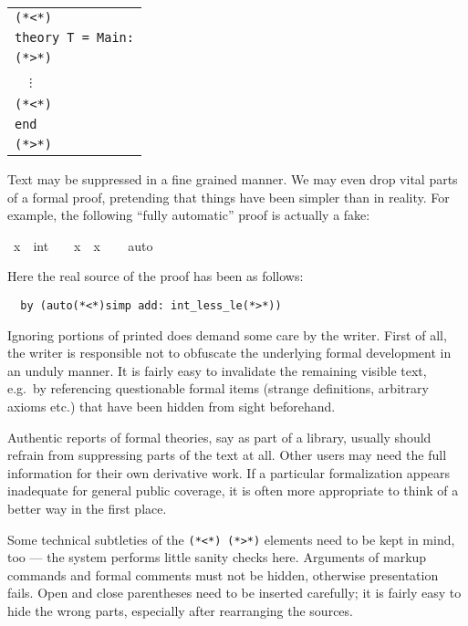 \begin{isabellebody}
\begin{isamarkuptext}
  \medskip

  \begin{tabular}{l}
  \verb,(,\verb,*,\verb,<,\verb,*,\verb,), \\
  \texttt{theory T = Main:} \\
  \verb,(,\verb,*,\verb,>,\verb,*,\verb,), \\
  ~~$\vdots$ \\
  \verb,(,\verb,*,\verb,<,\verb,*,\verb,), \\
  \texttt{end} \\
  \verb,(,\verb,*,\verb,>,\verb,*,\verb,), \\
  \end{tabular}

  \medskip

  Text may be suppressed in a fine grained manner.  We may even drop
  vital parts of a formal proof, pretending that things have been
  simpler than in reality.  For example, the following ``fully
  automatic'' proof is actually a fake:%
\end{isamarkuptext}%
\isamarkuptrue%
\ {\isachardoublequote}x\ {\isasymnoteq}\ {\isacharparenleft}{}{\isacharcolon}{\isacharcolon}int{\isacharparenright}\ {\isasymLongrightarrow}\ {}\ {\isacharless}\ x\ {\isacharasterisk}\ x{\isachardoublequote}\isanewline
\ \ \isamarkupfalse%
\ {\isacharparenleft}auto{\isacharparenright}\isamarkupfalse%
%
\begin{isamarkuptext}%
\noindent Here the real source of the proof has been as follows:

\begin{verbatim}
  by (auto(*<*)simp add: int_less_le(*>*))
\end{verbatim}

  \medskip Ignoring portions of printed does demand some care by the
  writer.  First of all, the writer is responsible not to obfuscate
  the underlying formal development in an unduly manner.  It is fairly
  easy to invalidate the remaining visible text, e.g.\ by referencing
  questionable formal items (strange definitions, arbitrary axioms
  etc.) that have been hidden from sight beforehand.

  Authentic reports of formal theories, say as part of a library,
  usually should refrain from suppressing parts of the text at all.
  Other users may need the full information for their own derivative
  work.  If a particular formalization appears inadequate for general
  public coverage, it is often more appropriate to think of a better
  way in the first place.

  \medskip Some technical subtleties of the
  \verb,(,\verb,*,\verb,<,\verb,*,\verb,),~\verb,(,\verb,*,\verb,>,\verb,*,\verb,),
  elements need to be kept in mind, too --- the system performs little
  sanity checks here.  Arguments of markup commands and formal
  comments must not be hidden, otherwise presentation fails.  Open and
  close parentheses need to be inserted carefully; it is fairly easy
  to hide the wrong parts, especially after rearranging the sources.%
\end{isamarkuptext}%
\isamarkuptrue%
\isamarkupfalse%
\end{isabellebody}%
